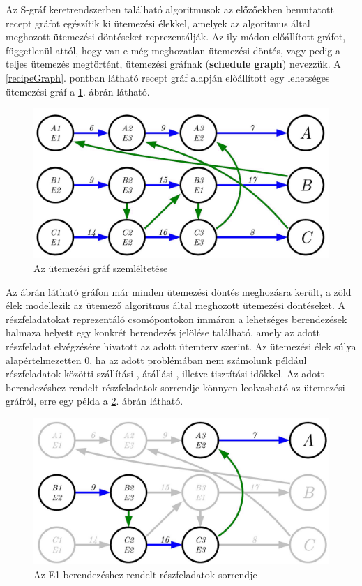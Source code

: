 Az S-gráf keretrendszerben található algoritmusok az előzőekben bemutatott recept gráfot egészítik ki ütemezési élekkel, amelyek az algoritmus által meghozott ütemezési döntéseket reprezentálják.
Az ily módon előállított gráfot, függetlenül attól, hogy van-e még meghozatlan ütemezési döntés, vagy pedig a teljes ütemezés megtörtént, ütemezési gráfnak (\textbf{schedule graph}) nevezzük.
A \ref{recipeGraph}. pontban látható recept gráf alapján előállított egy lehetséges ütemezési gráf a \ref{scheduleGraph}. ábrán látható.
\begin{figure}[H]
\begin{center}
\includegraphics[scale=0.375]{scheduleGraph}
\caption{Az ütemezési gráf szemléltetése}
\label{scheduleGraph}
\end{center}
\end{figure}
Az ábrán látható gráfon már minden ütemezési döntés meghozásra került, a zöld élek modellezik az ütemező algoritmus által meghozott ütemezési döntéseket.
A részfeladatokat reprezentáló csomópontokon immáron a lehetséges berendezések halmaza helyett egy konkrét berendezés jelölése található, amely az adott részfeladat elvégzésére hivatott az adott ütemterv szerint.
Az ütemezési élek súlya alapértelmezetten $0$, ha az adott problémában nem számolunk például részfeladatok közötti szállítási-, átállási-, illetve tisztítási időkkel.
Az adott berendezéshez rendelt részfeladatok sorrendje könnyen leolvasható az ütemezési gráfról, erre egy példa a \ref{unitSequence}. ábrán látható.
\begin{figure}[H]
\begin{center}
\includegraphics[scale=0.375]{unitSequence}
\caption{Az E1 berendezéshez rendelt részfeladatok sorrendje}
\label{unitSequence}
\end{center}
\end{figure}
